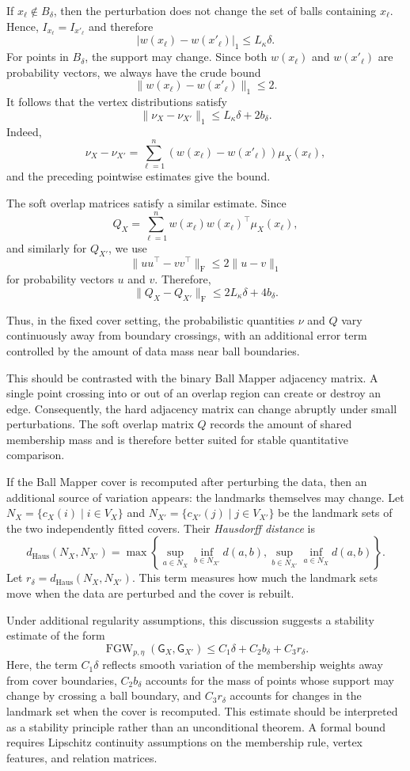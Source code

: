 \documentclass[9pt,a4paper,twocolumn,twoside]{extarticle}
\theoremstyle{definition}
\begin{document}
If $x_\ell \notin B_\delta$, then the perturbation does not change the set of balls containing $x_\ell$. Hence, $I_{x_\ell}=I_{x'_\ell}$ and therefore
\[
|w(x_\ell)-w(x'_\ell)|_1 \le L_\kappa\delta.
\]
For points in $B_\delta$, the support may change. Since both $w(x_\ell)$ and $w(x'_\ell)$ are probability vectors, we always have the crude bound
\[
\|w(x_\ell)-w(x'_\ell)\|_1\le 2.
\]
It follows that the vertex distributions satisfy
\[
\|\nu_X-\nu_{X'}\|_1 \le L_\kappa\delta +2b_\delta.
\]
Indeed,
\[
\nu_X-\nu_{X'} =\sum_{\ell=1}^n\left(w(x_\ell)-w(x'_\ell)\right)\mu_X({x_\ell}),
\]
and the preceding pointwise estimates give the bound.

The soft overlap matrices satisfy a similar estimate. Since
\[
Q_X =\sum_{\ell=1}^nw(x_\ell)w(x_\ell)^\top\mu_X({x_\ell}),
\]
and similarly for $Q_{X'}$, we use
\[
\|uu^\top-vv^\top\|_{\mathrm F} \le 2\|u-v\|_1
\]
for probability vectors $u$ and $v$. Therefore,
\[
\|Q_X-Q_{X'}\|_{\mathrm F} \le 2L_\kappa\delta + 4b_\delta.
\]

Thus, in the fixed cover setting, the probabilistic quantities $\nu$ and $Q$ vary continuously away from boundary crossings, with an additional error term controlled by the amount of data mass near ball boundaries.

This should be contrasted with the binary Ball Mapper adjacency matrix. A single point crossing into or out of an overlap region can create or destroy an edge. Consequently, the hard adjacency matrix can change abruptly under small perturbations. The soft overlap matrix $Q$ records the amount of shared membership mass and is therefore better suited for stable quantitative comparison.

If the Ball Mapper cover is recomputed after perturbing the data, then an additional source of variation appears: the landmarks themselves may change. Let $N_X = \{c_X(i) \mid i\in V_X\}$ and $N_{X'}=\{c_{X'}(j) \mid j\in V_{X'}\}$ be the landmark sets of the two independently fitted covers. Their \emph{Hausdorff distance} is
\[
d_{\mathrm{Haus}}(N_X,N_{X'}) = \max\left\{\sup_{a\in N_X}\inf_{b\in N_{X'}}d(a,b), \sup_{b\in N_{X'}}\inf_{a\in N_X}d(a,b)\right\}.
\]
Let $r_\delta=d_{\mathrm{Haus}}(N_X,N_{X'})$. This term measures how much the landmark sets move when the data are perturbed and the cover is rebuilt.

Under additional regularity assumptions, this discussion suggests a stability estimate of the form
\[
\operatorname{FGW}_{p,\eta}(\mathsf G_X,\mathsf G_{X'}) \le C_1\delta + C_2b_\delta + C_3r_\delta.
\]
Here, the term $C_1\delta$ reflects smooth variation of the membership weights away from cover boundaries, $C_2b_\delta$ accounts for the mass of points whose support may change by crossing a ball boundary, and $C_3r_\delta$ accounts for changes in the landmark set when the cover is recomputed. This estimate should be interpreted as a stability principle rather than an unconditional theorem. A formal bound requires Lipschitz continuity assumptions on the membership rule, vertex features, and relation matrices.
\end{document}
